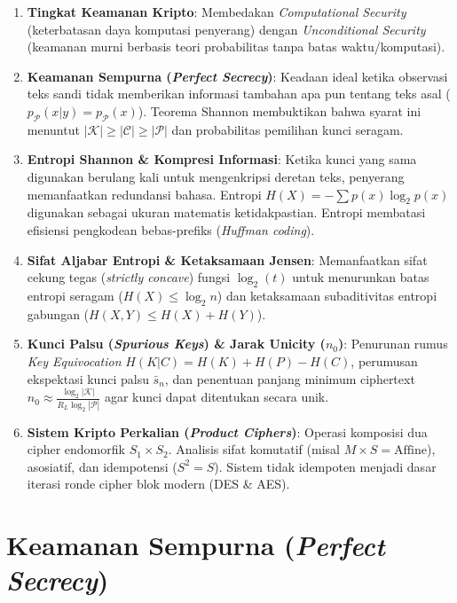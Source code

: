 \documentclass[11pt,a4paper]{article}
\begin{document}
\begin{enumerate}[leftmargin=*]
    \item \textbf{Tingkat Keamanan Kripto}: Membedakan \textit{Computational Security} (keterbatasan daya komputasi penyerang) dengan \textit{Unconditional Security} (keamanan murni berbasis teori probabilitas tanpa batas waktu/komputasi).
    \item \textbf{Keamanan Sempurna (\textit{Perfect Secrecy})}: Keadaan ideal ketika observasi teks sandi tidak memberikan informasi tambahan apa pun tentang teks asal ($p_{\mathcal{P}}(x|y) = p_{\mathcal{P}}(x)$). Teorema Shannon membuktikan bahwa syarat ini menuntut $|\mathcal{K}| \ge |\mathcal{C}| \ge |\mathcal{P}|$ dan probabilitas pemilihan kunci seragam.
    \item \textbf{Entropi Shannon \& Kompresi Informasi}: Ketika kunci yang sama digunakan berulang kali untuk mengenkripsi deretan teks, penyerang memanfaatkan redundansi bahasa. Entropi $H(X) = -\sum p(x)\log_2 p(x)$ digunakan sebagai ukuran matematis ketidakpastian. Entropi membatasi efisiensi pengkodean bebas-prefiks (\textit{Huffman coding}).
    \item \textbf{Sifat Aljabar Entropi \& Ketaksamaan Jensen}: Memanfaatkan sifat cekung tegas (\textit{strictly concave}) fungsi $\log_2(t)$ untuk menurunkan batas entropi seragam ($H(X) \le \log_2 n$) dan ketaksamaan subaditivitas entropi gabungan ($H(X, Y) \le H(X) + H(Y)$).
    \item \textbf{Kunci Palsu (\textit{Spurious Keys}) \& Jarak Unicity ($n_0$)}: Penurunan rumus \textit{Key Equivocation} $H(K|C) = H(K) + H(P) - H(C)$, perumusan ekspektasi kunci palsu $\bar{s}_n$, dan penentuan panjang minimum ciphertext $n_0 \approx \frac{\log_2 |\mathcal{K}|}{R_L \log_2 |\mathcal{P}|}$ agar kunci dapat ditentukan secara unik.
    \item \textbf{Sistem Kripto Perkalian (\textit{Product Ciphers})}: Operasi komposisi dua cipher endomorfik $S_1 \times S_2$. Analisis sifat komutatif (misal $M \times S = \text{Affine}$), asosiatif, dan idempotensi ($S^2 = S$). Sistem tidak idempoten menjadi dasar iterasi ronde cipher blok modern (DES \& AES).
\end{enumerate}

\section{Keamanan Sempurna (\textit{Perfect Secrecy})}
\end{document}
